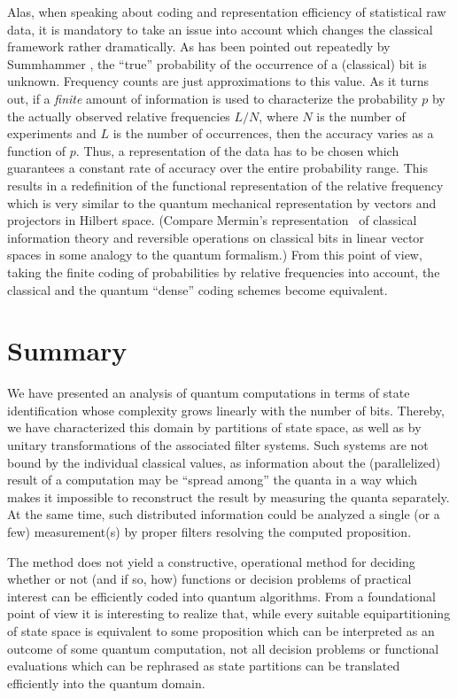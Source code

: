 Alas, when speaking about coding and representation efficiency of statistical raw data,
it is mandatory to take an issue into account which changes the classical
framework rather dramatically.
As has been pointed out repeatedly by Summhammer
\cite{sum-1,summi:93},  the ``true'' probability of the
occurrence of a (classical) bit is unknown.
Frequency counts are just approximations to this value.
As it turns out, if a {\em finite} amount of information is used
to characterize the probability $p$ by the actually observed relative frequencies
$L/N$, where $N$ is the number of experiments and $L$ is the number of occurrences,
then the accuracy varies as a function of $p$.
Thus,
a representation of the data
has to be chosen which guarantees a constant rate of accuracy over
the entire probability range.
This results in a redefinition of the functional representation of the
relative frequency which is very similar to the quantum mechanical
representation by vectors and projectors in Hilbert space.
(Compare Mermin's
representation~\cite{mermin-02,mermin-04,mermin-qc}
of classical information theory and reversible operations on classical bits
in linear vector spaces in some analogy to the quantum formalism.)
From this point of view, taking the finite coding of probabilities by
relative frequencies into account, the classical and the quantum ``dense''
coding schemes become equivalent.

\section{Summary}

We have presented an analysis of quantum computations in terms of state identification
whose complexity grows linearly with the number of bits.
Thereby, we have characterized this domain by partitions of state space,
as well as by unitary transformations of the associated filter systems.
Such systems are not bound by the individual classical values,
as information about the (parallelized)
result of a computation may be ``spread among'' the quanta
in a way which makes it impossible to reconstruct the result
by measuring the quanta separately.
At the same time, such distributed information could be analyzed a single (or a few)
measurement(s) by proper filters resolving the computed proposition.


The method does not yield a constructive, operational method
for deciding
whether or not (and if so, how) functions or decision problems of practical interest
can be efficiently coded into quantum algorithms.
From a foundational point of view it is interesting
to realize that, while every suitable equipartitioning of state space
is equivalent to some proposition which can be interpreted as an outcome of some
quantum computation,
not all decision problems or functional evaluations which can be rephrased as
state partitions can be translated efficiently into the quantum domain.

